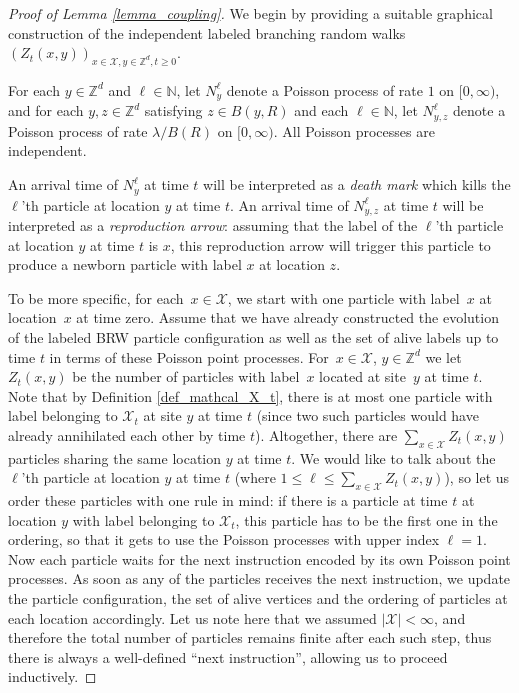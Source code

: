 \documentclass[a4paper,12pt]{article}
\newcommand{\Z}{\mathbb{Z}}
\begin{document}
\begin{proof}[Proof of Lemma \ref{lemma_coupling}] We begin by providing a suitable graphical construction of the independent labeled branching random walks $(Z_t(x,y))_{x \in \mathcal{X},y \in \mathbb{Z}^d, t \geq 0}$.

For each $y \in \mathbb{Z}^d$ and $\ell \in \mathbb{N}$, let $N^{\ell}_y$
denote a Poisson process of rate $1$ on $[0,\infty)$,  and for each $y,z \in \mathbb{Z}^d$ satisfying $z \in B(y,R)$ and each $\ell \in \mathbb{N}$, let $N^{\ell}_{y,z}$
denote a Poisson process of rate $\lambda/B(R)$ on $[0,\infty)$.
 All Poisson processes are independent.

\smallskip

  An arrival time of $N^{\ell}_y$ at time $t$ will be interpreted as a \emph{death mark} which kills the $\ell$'th particle at location $y$ at time $t$.  An arrival time of $N^{\ell}_{y,z}$ at time $t$ will be interpreted as a \emph{reproduction arrow}: assuming that the label of the $\ell$'th particle at location $y$ at time $t$ is $x$, this reproduction arrow will trigger this particle to produce a newborn particle with label $x$ at location $z$.

\smallskip

  To be more specific, for each~$x \in \mathcal{X}$, we start with  one particle with label~$x$ at location~$x$ at time zero. Assume that we have already constructed the evolution of the labeled BRW particle  configuration as well as the set of alive labels up to time $t$ in terms of these Poisson point processes. For~$x \in \mathcal{X}$, $y \in \Z^d$ we let~$Z_t(x,y)$ be the number of particles with label~$x$ located at site~$y$ at time $t$.
   Note that by Definition \ref{def_mathcal_X_t}, there is at most one particle with label belonging to $\mathcal{X}_t$ at site $y$  at time $t$ (since two such particles would
   have already annihilated each other by time $t$).
      Altogether, there are $\sum_{x \in \mathcal{X}} Z_t(x,y)$ particles sharing the same location $y$ at time $t$.
   We would like to talk about the $\ell$'th particle at location $y$ at time $t$ (where $1 \leq \ell \leq \sum_{x \in \mathcal{X}} Z_t(x,y)$), so let us order these particles with one rule in mind: if there is a particle at time $t$ at location $y$ with label belonging to $\mathcal{X}_t$, this particle has to be the first one in the ordering, so that it gets to use the Poisson processes with upper index $\ell=1$.
  Now each particle waits for the next instruction encoded by its own Poisson point processes. As soon as any of the particles receives the next instruction, we update the particle configuration, the set of alive vertices and the ordering of particles at each location accordingly. Let us note here that we assumed $|\mathcal{X}|<\infty$, and therefore the total number of particles remains finite after each such step, thus there is always a well-defined
``next instruction'', allowing us to proceed inductively.


\end{proof}
\end{document}
